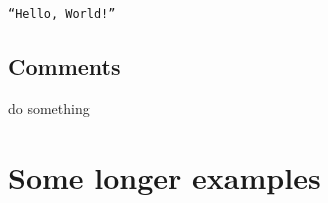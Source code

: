 \documentclass{amsart}
\begin{document}
\begin{algorithmic}
\PRINT \texttt{``Hello, World!''}
\end{algorithmic}

\subsection{Comments}

\begin{algorithmic}
\STATE do something 
\end{algorithmic}

\section{Some longer examples}


\end{document}
